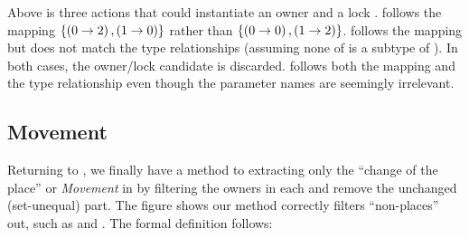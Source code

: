 {

}
Above is three actions that could instantiate an owner
 and a lock .
 follows the mapping
$\left\{\left(0 \rightarrow 2\right),\left(1 \rightarrow 0\right)\right\}$ rather than
$\left\{\left(0 \rightarrow 0\right),\left(1 \rightarrow 2\right)\right\}$.
 follows the mapping but does not match the type relationships
(assuming none of  is a subtype of ).
In both cases, %
the owner/lock candidate
is discarded.
follows
both the mapping and the type relationship
even though the parameter names are seemingly irrelevant.

\subsection{Movement}

Returning to ,
we finally have a method to extracting only the ``change of the place'' or {\em Movement} in \psteps
by filtering the owners in each \pstep and remove the unchanged (set-unequal) part.
The figure shows our method correctly filters ``non-places'' out, such as 
 and .
The formal definition follows:



